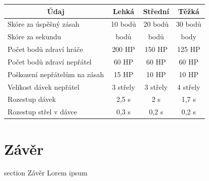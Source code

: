 \documentclass[12pt,a4paper,hidelinks]{article}
\begin{document}
\begin{table}[h!]
\centering
\begin{tabular}{@{}l|ccc@{}}
\toprule
\multicolumn{1}{c|}{\textbf{Údaj}} & \textbf{Lehká} & \textbf{Střední} & \textbf{Těžká} \\ \midrule
Skóre za úspěšný zásah             & 10 bodů        & 20 bodů          & 30 bodů        \\
Skóre za sekundu                   & \textminus5 bodů        & \textminus3 bodů          & \textminus2 body        \\
Počet bodů zdraví hráče            & 200 HP         & 150 HP           & 125 HP         \\
Počet bodů zdraví nepřátel         & 60 HP          & 60 HP            & 60 HP          \\
Poškození nepřátelům na zásah      & 15 HP          & 10 HP            & 10 HP          \\
Velikost dávek nepřátel            & 3 střely       & 3 střely         & 4 střely       \\
Rozestup dávek                     & 2,5 s          & 2 s              & 1,7 s          \\
Rozestup střel v dávce             & 0,3 s          & 0,2 s            & 0,2 s          \\ \bottomrule
\end{tabular}
\end{table}


\clearpage
\section*{Závěr}
 {section} {Závěr}
Lorem ipsum


\clearpage
\appendix
\end{document}
